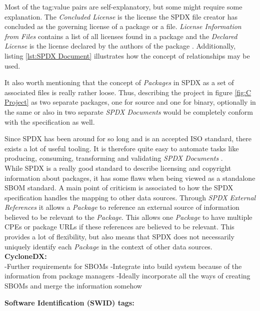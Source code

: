 \noindent
Most of the tag:value pairs are self-explanatory, but some might require some explanation. The \textit{Concluded License} is the license the SPDX file creator has concluded as the governing license of a package or a file. \textit{License Information from Files} contains a list of all licenses found in a package and the \textit{Declared License} is the license declared by the authors of the package \cite{SPDXSpec}. Additionally, listing \ref{lst:SPDX Document} illustrates how the concept of relationships may be used.\par
It also worth mentioning that the concept of \textit{Packages} in SPDX as a set of associated files is really rather loose. Thus, describing the project in figure \ref{fig:C Project} as two separate packages, one for source and one for binary, optionally in the same or also in two separate \textit{SPDX Documents} would be completely conform with the specification as well.\par
Since SPDX has been around for so long and is an accepted ISO standard, there exists a lot of useful tooling. It is therefore quite easy to automate tasks like producing, consuming, transforming and validating \textit{SPDX Documents} \cite{SPDXWebsite}.\\

\noindent
While SPDX is a really good standard to describe licensing and copyright information about packages, it has some flaws when being viewed as a standalone SBOM standard. A main point of criticism is associated to how the SPDX specification handles the mapping to other data sources. Through \textit{SPDX External References} it allows a \textit{Package} to reference an external source of information believed to be relevant to the \textit{Package}. This allows one \textit{Package} to have multiple CPEs or package URLs if these references are believed to be relevant. This provides a lot of flexibility, but also means that SPDX does not necessarily uniquely identify each \textit{Package} in the context of other data sources.\\
 
\noindent
\textbf{CycloneDX:}\\
-Further requirements for SBOMs
-Integrate into build system because of the information from package managers
-Ideally incorporate all the ways of creating SBOMs and merge the information somehow

\noindent
\textbf{Software Identification (SWID) tags:}\\

